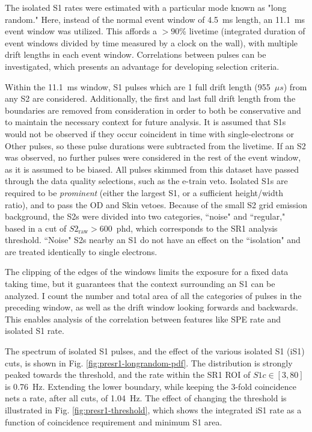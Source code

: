 The isolated S1 rates were estimated with a particular mode known as "long random."
Here, instead of the normal event window of 4.5~ms length, an 11.1~ms event window was utilized.
This affords a $>90$\% livetime (integrated duration of event windows divided by time measured by a clock on the wall), with multiple drift lengths in each event window.
Correlations between pulses can be investigated, which presents an advantage for developing selection criteria.

Within the 11.1~ms window, S1 pulses which are 1 full drift length (955~$\mu s$) from any S2 are considered.
Additionally, the first and last full drift length from the boundaries are removed from consideration in order to both be conservative and to maintain the necessary context for future analysis.
It is assumed that S1s would not be observed if they occur coincident in time with single-electrons or Other pulses, so these pulse durations were subtracted from the livetime.
If an S2 was observed, no further pulses were considered in the rest of the event window, as it is assumed to be biased.
All pulses skimmed from this dataset have passed through the data quality selections, such as the e-train veto.
Isolated S1s are required to be \textit{prominent} (either the largest S1, or a sufficient height/width ratio), and to pass the OD and Skin vetoes.
Because of the small S2 grid emission background, the S2s were divided into two categories, ``noise" and ``regular," based in a cut of $S2_{\text{raw}} > 600$~phd, which corresponds to the SR1 analysis threshold.
``Noise" S2s nearby an S1 do not have an effect on the ``isolation" and are treated identically to single electrons.

The clipping of the edges of the windows limits the exposure for a fixed data taking time, but it guarantees that the context surrounding an S1 can be analyzed.
I count the number and total area of all the categories of pulses in the preceding window, as well as the drift window looking forwards and backwards.
This enables analysis of the correlation between features like SPE rate and isolated S1 rate.

The spectrum of isolated S1 pulses, and the effect of the various isolated S1 (iS1) cuts, is shown in Fig. 
\ref{fig:presr1-longrandom-pdf}.
The distribution is strongly peaked towards the threshold, and the rate within the SR1 ROI of $S1c \in [3,80]$ is 0.76~Hz.
Extending the lower boundary, while keeping the 3-fold coincidence nets a rate, after all cuts, of 1.04~Hz.
The effect of changing the threshold is illustrated in Fig. \ref{fig:presr1-threshold}, which shows the integrated iS1 rate as a function of coincidence requirement and minimum S1 area.

